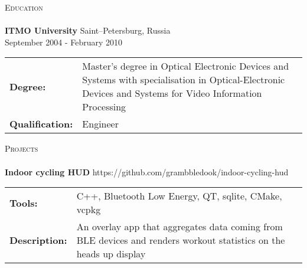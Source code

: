 \documentclass[a4paper]{article}
\makeatletter
\newcommand{\lineunder} {
    \vspace*{-8pt} \\
    \hspace*{-18pt} \hrulefill \\
}
\newcommand{\header} [1] {
        {\hspace*{-18pt}\vspace*{6pt} \textsc{#1}}
    \vspace*{-6pt} \lineunder
}
\newcommand{\education} [5] {
    \textbf{#1} \hfill {#4} \\ {#5} \\ \vspace{1mm}
    \begin{tabularx}{\textwidth}{@{}p{3cm} X@{}}
    \textbf{Degree:} & {#2} \\
    \textbf{Qualification:} & {#3} \\
    \end{tabularx}
    \vspace{2mm}
}
\newcommand{\project} [4] {
    \textbf{#1} \hfill {#4} \\ \vspace{1mm}
    \begin{addmargin}[0em]{1em}
    \begin{tabularx}{\textwidth}{@{}p{3cm} X@{}}
    \textbf{Tools:} & {#2} \\
    \textbf{Description:} & {#3} \\
    \end{tabularx}
    \end{addmargin}
    \vspace{2mm}
}
\makeatother
\begin{document}
    \header{Education}

    \education{ITMO University}
    {Master’s degree in Optical Electronic Devices and Systems with specialisation in Optical-Electronic Devices and Systems for Video Information Processing}
    {Engineer}
    {Saint–Petersburg, Russia}
    {September 2004 - February 2010}


    \header{Projects}
    \project{\textbf Indoor cycling HUD}
    {C++, Bluetooth Low Energy, QT, sqlite, CMake, vcpkg}
    {An overlay app that aggregates data coming from BLE devices and renders workout statistics on the heads up display}
    {https://github.com/grambbledook/indoor-cycling-hud}
%
%
\end{document}
